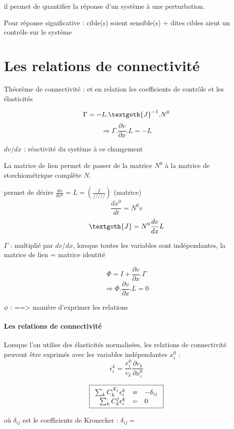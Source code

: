 \Rightarrow il permet de quantifier la réponse d'un système à une perturbation.

Pour réponse significative : cible(s) soient sensible(s) + dites cibles aient un contrôle sur le système




\section{Les relations de connectivité}
Théorème de connectivité : et en relation les coefficients de contrôle et les élasticités

$$\Gamma = -L . \textgoth{J}^{-1}.N^0 $$
$$ \Rightarrow \Gamma . \frac{\partial v}{\partial x} . L = - L $$


$dv/dx$ : réactivité du système à ce changement

La matrice de lien permet de passer de la matrice $N^0$ à la matrice de stœchiométrique complète $N$.

permet de dérire $\frac{dx}{dx^0}= L= (\frac{I}{/////})$ (matrice)
	$$ \frac{dx^0}{dt}= N^0v $$
	$$ \textgoth{J} = N^0 \frac{dv}{dx}L $$

$\Gamma$ : multiplié par $dv/dx$, lorsque toutes les variables sont indépendantes, la matrice de lien = matrice identité


$$ \Phi = I + \frac{\partial v}{\partial x} . \Gamma $$
$$ \Rightarrow    \Phi . \frac{\partial v}{\partial x} . L = 0 $$


$\phi$ : 
==> manière d'exprimer les relations


\paragraph{Les relations de connectivité}
Lorsque l'on utilise des élasticités normalisées, les relations de connectivité peuvent être exprimés avec les variables indépendantes $x_i^0$ :
$$ \epsilon_i^k = \frac{x_i^0}{v_k} \frac{\partial v_k}{\partial x_i^0} $$

\begin{equation}
   \fbox{$
   \begin{array}{rcl}
      \sum_k C_k^{X_j} \epsilon_i^k & = & - \delta_{ij} \\
      \sum_k C_k^j \epsilon_i^k & = & 0
   \end{array}
   $}
\end{equation}

où $\delta_{ij}$ est le coefficients de Kronecker :  $\delta_{ij} = $

